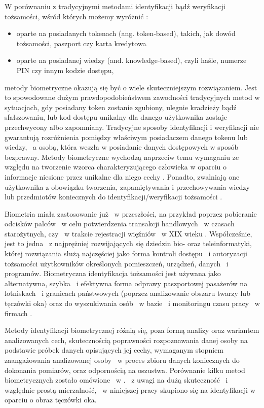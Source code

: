 W porównaniu z tradycyjnymi metodami identyfikacji bądź weryfikacji tożsamości, wśród których możemy wyróżnić \cite{Jain00}\cite{Jain08}:
\begin{itemize}
\item oparte na posiadanych tokenach (ang. token-based), takich, jak dowód tożsamości, paszport czy karta kredytowa
\item oparte na posiadanej wiedzy (and. knowledge-based), czyli haśle, numerze PIN czy innym kodzie dostępu,
\end{itemize}
metody biometryczne okazują się być o wiele skuteczniejszym rozwiązaniem. Jest to spowodowane dużym prawdopodobieństwem zawodności tradycyjnych metod w sytuacjach, gdy posiadany token zostanie zgubiony, ulegnie kradzieży bądź sfałszowaniu, lub kod dostępu unikalny dla danego użytkownika zostaje przechwycony albo zapomniany. Tradycyjne sposoby identyfikacji i weryfikacji nie gwarantują rozróżnienia pomiędzy właściwym posiadaczem danego tokenu lub wiedzy, ~a osobą, która weszła w posiadanie danych dostępowych w sposób bezprawny. Metody biometryczne wychodzą naprzeciw temu wymaganiu ze względu na tworzenie wzorca charakteryzującego człowieka w oparciu o informacje niesione przez unikalne dla niego cechy \cite{Jain00}. Ponadto, zwalniają one użytkownika z obowiązku tworzenia, zapamiętywania i przechowywania wiedzy lub przedmiotów koniecznych do identyfikacji/weryfikacji tożsamości \cite{Jain08}.  

Biometria miała zastosowanie już ~w przeszłości, na przykład poprzez pobieranie odcisków palców ~w celu potwierdzenia transakcji handlowych ~w czasach starożytnych, czy ~w trakcie rejestracji więźniów ~w XIX wieku \cite{Bio02}\cite{HF1}. Współcześnie, jest to jedna ~z najprężniej rozwijających się dziedzin bio- oraz teleinformatyki, której rozwiązania służą najczęściej jako forma kontroli dostępu ~i autoryzacji tożsamości użytkowników określonych pomieszczeń, urządzeń, danych ~i programów. Biometryczna identyfikacja tożsamości jest używana jako alternatywna, szybka ~i efektywna forma odprawy paszportowej pasażerów na lotniskach ~i granicach państwowych (poprzez analizowanie obszaru twarzy lub tęczówki oka) oraz do wyszukiwania osób ~w bazie ~i monitoringu czasu pracy ~w firmach \cite{Bio01}\cite{Bio02}.

Metody identyfikacji biometrycznej różnią się, poza formą analizy oraz wariantem analizowanych cech, skutecznością poprawności rozpoznawania danej osoby na podstawie próbek danych opisujących jej cechy, wymaganym stopniem zaangażowania analizowanej osoby ~w proces zbioru danych koniecznych do dokonania pomiarów, oraz odpornością na oszustwa. Porównanie kilku metod biometrycznych zostało omówione ~w \cite{Gl11}. ~z uwagi na dużą skuteczność ~i względnie prostą mierzalność, ~w niniejszej pracy skupiono się na identyfikacji w oparciu o obraz tęczówki oka.


